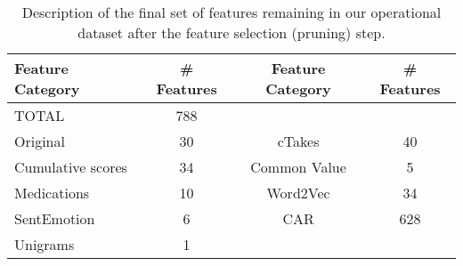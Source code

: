 \begin{table}
    \centering
    \begin{tabular}{|l|c|c|c|}
    \hline
    \textsf{Feature Category} & \textsf{\# Features} & \textsf{Feature Category} & \textsf{\# Features} \\
    \hline
    \textsf{TOTAL} & 788 & & \\
    \hline
    \textsf{Original} & 30 & \textsf{cTakes} & 40 \\
    \textsf{Cumulative scores} & 34 & \textsf{Common Value} & 5 \\
    \textsf{Medications} & 10 & \textsf{Word2Vec} & 34 \\
    \textsf{SentEmotion} & 6  & \textsf{CAR} & 628 \\
    \textsf{Unigrams} & 1 & & \\
     \hline
    \end{tabular}
    \caption{Description of the final set of features remaining in our
    operational dataset after the feature selection (pruning) step.}
    \label{tab:data3}
\end{table}


